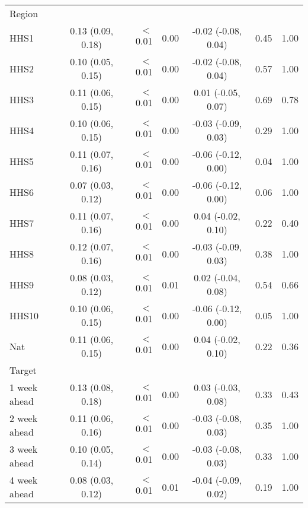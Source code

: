 \documentclass[sagev,times,Review,10pt]{sagej}
\begin{document}
\begin{appendix}
\begin{table}[ht!]
\begin{tabular}{lcrrcrr}
 Region\\    
 \hspace{3mm}	HHS1            & 0.13 (0.09, 0.18)   & $<$0.01  & 0.00      & -0.02 (-0.08, 0.04) & 0.45 & 1.00 \\
 \hspace{3mm}	HHS2            & 0.10 (0.05, 0.15)   & $<$0.01  & 0.00      & -0.02 (-0.08, 0.04) & 0.57 & 1.00 \\
 \hspace{3mm}	HHS3            & 0.11 (0.06, 0.15)   & $<$0.01  & 0.00      &  0.01 (-0.05, 0.07) & 0.69 & 0.78 \\
 \hspace{3mm}	HHS4            & 0.10 (0.06, 0.15)   & $<$0.01  & 0.00      & -0.03 (-0.09, 0.03) & 0.29 & 1.00 \\
 \hspace{3mm}	HHS5            & 0.11 (0.07, 0.16)   & $<$0.01  & 0.00      & -0.06 (-0.12, 0.00) & 0.04 & 1.00 \\
 \hspace{3mm}	HHS6            & 0.07 (0.03, 0.12)   & $<$0.01  & 0.00      & -0.06 (-0.12, 0.00) & 0.06 & 1.00 \\
 \hspace{3mm}	HHS7            & 0.11 (0.07, 0.16)   & $<$0.01  & 0.00      &  0.04 (-0.02, 0.10) & 0.22 & 0.40 \\
 \hspace{3mm}	HHS8            & 0.12 (0.07, 0.16)   & $<$0.01  & 0.00      & -0.03 (-0.09, 0.03) & 0.38 & 1.00 \\
 \hspace{3mm}	HHS9            & 0.08 (0.03, 0.12)   & $<$0.01  & 0.01      &  0.02 (-0.04, 0.08) & 0.54 & 0.66 \\
 \hspace{3mm}	HHS10           & 0.10 (0.06, 0.15)   & $<$0.01  & 0.00      & -0.06 (-0.12, 0.00) & 0.05 & 1.00 \\
 \hspace{3mm}	Nat             & 0.11 (0.06, 0.15)   & $<$0.01  & 0.00      &  0.04 (-0.02, 0.10) & 0.22 & 0.36 \\

 Target\\
 \hspace{3mm}	1 week ahead	& 0.13 (0.08, 0.18) & $<$0.01 & 0.00  &  0.03 (-0.03, 0.08) & 0.33 & 0.43 \\
 \hspace{3mm}	2 week ahead	& 0.11 (0.06, 0.16) & $<$0.01 & 0.00  & -0.03 (-0.08, 0.03) & 0.35 & 1.00 \\
 \hspace{3mm}	3 week ahead	& 0.10 (0.05, 0.14) & $<$0.01 & 0.00  & -0.03 (-0.08, 0.03) & 0.33 & 1.00 \\
 \hspace{3mm}	4 week ahead	& 0.08 (0.03, 0.12) & $<$0.01 & 0.01  & -0.04 (-0.09, 0.02) & 0.19 & 1.00 \\
 \hline
\end{tabular}


\end{table}
\end{appendix}
\end{document}
